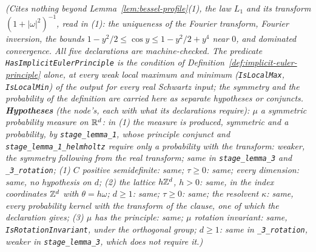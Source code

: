 \begin{proposition}[the stage lemma]
\statusT\quad\emph{(Cites nothing beyond Lemma~\ref{lem:bessel-profile}(1), the law $L_1$ and its
transform $(1 + |\omega|^2)^{-1}$, read in (1): the uniqueness of the Fourier transform, Fourier
inversion, the bounds $1 - y^2/2 \le \cos y \le 1 - y^2/2 + y^4$ near $0$, and dominated
convergence. All five declarations are machine-checked. The predicate
\texttt{HasImplicitEulerPrinciple} is the condition of Definition~\ref{def:implicit-euler-principle}
alone, at every weak local maximum and minimum (\texttt{IsLocalMax}, \texttt{IsLocalMin}) of the
output for every real Schwartz input; the symmetry and the probability of the definition are
carried here as separate hypotheses or conjuncts. \textbf{Hypotheses} (the node's, each with what
its declarations require): $\mu$ a symmetric probability measure on $\mathbb{R}^d$: in (1) the measure is
produced, symmetric and a probability, by \texttt{stage\_lemma\_1}, whose principle conjunct and
\texttt{stage\_lemma\_1\_helmholtz} require only a probability with the transform: weaker, the symmetry
following from the real transform; same in \texttt{stage\_lemma\_3} and \texttt{\_3\_rotation};
(1) $C$ positive semidefinite: same; $\tau \ge 0$: same; every dimension: same, no hypothesis on
$d$; (2) the lattice $h\mathbb{Z}^d$, $h > 0$: same, in the index coordinates $\mathbb{Z}^d$ with $\theta = h\omega$;
$d \ge 1$: same; $\tau \ge 0$: same; the resolvent $\kappa$: same, every probability kernel with the
transform of the clause, one of which the declaration gives; (3) $\mu$ has the principle: same;
$\mu$ rotation invariant: same, \texttt{IsRotationInvariant}, under the orthogonal group;
$d \ge 1$: same in \texttt{\_3\_rotation}, weaker in \texttt{stage\_lemma\_3}, which does not
require it.)}
\end{proposition}

